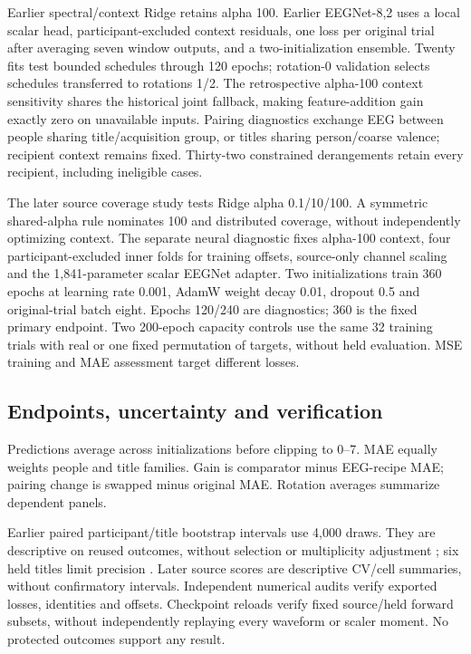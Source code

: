 \documentclass[10pt,letterpaper]{article}
\begin{document}
Earlier spectral/context Ridge retains alpha 100. Earlier EEGNet-8,2 uses a local scalar head, participant-excluded context residuals, one loss per original trial after averaging seven window outputs, and a two-initialization ensemble. Twenty fits test bounded schedules through 120 epochs; rotation-0 validation selects schedules transferred to rotations 1/2. The retrospective alpha-100 context sensitivity shares the historical joint fallback, making feature-addition gain exactly zero on unavailable inputs. Pairing diagnostics exchange EEG between people sharing title/acquisition group, or titles sharing person/coarse valence; recipient context remains fixed. Thirty-two constrained derangements retain every recipient, including ineligible cases.

The later source coverage study tests Ridge alpha 0.1/10/100. A symmetric shared-alpha rule nominates 100 and distributed coverage, without independently optimizing context. The separate neural diagnostic fixes alpha-100 context, four participant-excluded inner folds for training offsets, source-only channel scaling and the 1,841-parameter scalar EEGNet adapter. Two initializations train 360 epochs at learning rate 0.001, AdamW weight decay 0.01, dropout 0.5 and original-trial batch eight. Epochs 120/240 are diagnostics; 360 is the fixed primary endpoint. Two 200-epoch capacity controls use the same 32 training trials with real or one fixed permutation of targets, without held evaluation. MSE training and MAE assessment target different losses.

\subsection{Endpoints, uncertainty and verification}
Predictions average across initializations before clipping to 0--7. MAE equally weights people and title families. Gain is comparator minus EEG-recipe MAE; pairing change is swapped minus original MAE. Rotation averages summarize dependent panels.

Earlier paired participant/title bootstrap intervals use 4,000 draws. They are descriptive on reused outcomes, without selection or multiplicity adjustment \cite{owen2007,owen2012}; six held titles limit precision \cite{westfall2014power}. Later source scores are descriptive CV/cell summaries, without confirmatory intervals. Independent numerical audits verify exported losses, identities and offsets. Checkpoint reloads verify fixed source/held forward subsets, without independently replaying every waveform or scaler moment. No protected outcomes support any result.
\end{document}

